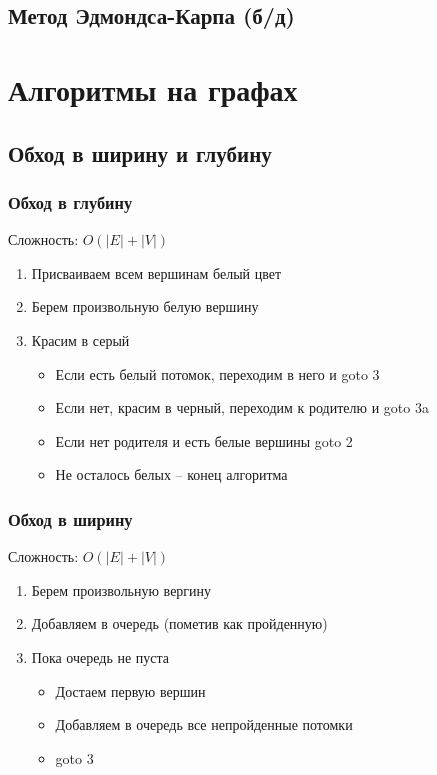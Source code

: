 \documentclass[a4paper]{article}
\begin{document}
\subsection{Метод Эдмондса-Карпа (б/д)}

\section{Алгоритмы на графах}
\subsection{Обход в ширину и глубину}
\subsubsection{Обход в глубину}
Сложность: $O(|E| + |V|)$
\begin{enumerate}
	\item Присваиваем всем вершинам белый цвет
	\item Берем произвольную белую вершину
	\item Красим в серый
	\begin{itemize}
		\item Если есть белый потомок, переходим в него и goto 3
		\item Если нет, красим в черный, переходим к родителю и goto 3a
		\item Если нет родителя и есть белые вершины goto 2
		\item Не осталось белых – конец алгоритма
	\end{itemize}
\end{enumerate}

\subsubsection{Обход в ширину}
Сложность: $O(|E| + |V|)$
\begin{enumerate}
	\item Берем произвольную вергину
	\item Добавляем в очередь (пометив как пройденную)
	\item Пока очередь не пуста
	\begin{itemize}
		\item Достаем первую вершин
		\item Добавляем в очередь все непройденные потомки
		\item goto 3
	\end{itemize}
\end{enumerate}
\end{document}
